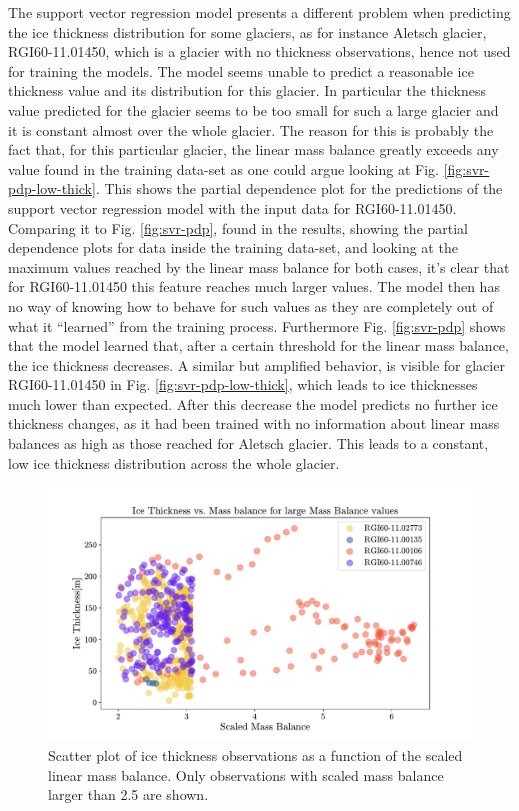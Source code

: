 The support vector regression model presents a different problem when predicting the ice thickness distribution for some glaciers, as for instance Aletsch glacier, RGI60-11.01450, which is a glacier with no thickness observations, hence not used for training the models. The model seems unable to predict a reasonable ice thickness value and its distribution for this glacier. In particular the thickness value predicted for the glacier seems to be too small for such a large glacier and it is constant almost over the whole glacier. The reason for this is probably the fact that, for this particular glacier, the linear mass balance greatly exceeds any value found in the training data-set as one could argue looking at Fig. \ref{fig:svr-pdp-low-thick}. This shows the partial dependence plot for the predictions of the support vector regression model with the input data for RGI60-11.01450. Comparing it to Fig. \ref{fig:svr-pdp}, found in the results, showing the partial dependence plots for data inside the training data-set, and looking at the maximum values reached by  the linear mass balance for both cases, it's clear that for RGI60-11.01450 this feature reaches much larger values. The model then has no way of knowing how to behave for such values as they are completely out of what it ``learned'' from the training process. Furthermore Fig. \ref{fig:svr-pdp} shows that the model learned that, after a certain threshold for the linear mass balance, the ice thickness decreases. A similar but amplified behavior, is visible for glacier RGI60-11.01450 in Fig. \ref{fig:svr-pdp-low-thick}, which leads to ice thicknesses much lower than expected. After this decrease the model predicts no further ice thickness changes, as it had been trained with no information about linear mass balances as high as those reached for Aletsch glacier. This leads to a constant, low ice thickness distribution across the whole glacier.
\begin{figure}[!tp]
	\centering		  
	\includegraphics[width=1.\textwidth]{figures/thick_mb_sitribution.pdf}
	\caption{Scatter plot of ice thickness observations as a function of the scaled linear mass balance. Only observations with scaled mass balance larger than 2.5 are shown.}
	\label{fig:scatter-mb}
\end{figure}
